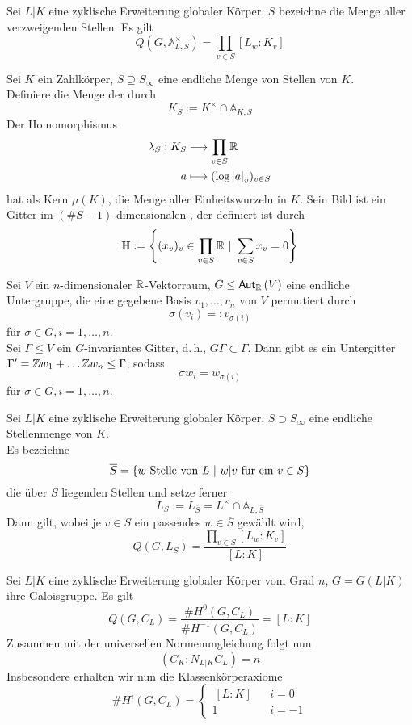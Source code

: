 \documentclass{book}
\renewcommand{\A}{\mathbb{A}}
\renewcommand{\i}{^{-1}}
\begin{document}
\Satz{}
Sei $L|K$ eine zyklische Erweiterung globaler Körper, $S$ bezeichne die Menge aller verzweigenden Stellen. Es gilt
\[ Q(G, \A_{L,S}^\times) = \prod_{v\in S} [L_w:K_v] \]

\Satz{}
Sei $K$ ein Zahlkörper, $S \supseteq S_\infty$ eine endliche Menge von Stellen von $K$.\\
Definiere die Menge der  durch
\[ K_S := K^\times \cap \A_{K,S} \]
Der Homomorphismus
\begin{align*}
\lambda_S : K_S &\overset{}{\longrightarrow} \prod_{v\in S} \mathbb{R}\\
a & \longmapsto (\log \left|a\right|_v)_{v\in S} 
\end{align*}
hat als Kern $\mu(K)$, die Menge aller Einheitswurzeln in $K$. Sein Bild ist ein Gitter im $(\#S-1)$-dimensionalen , der definiert ist durch
\[ \H:= \set{(x_v)_v \in \prod_{v\in S}\R }{\sum_{v\in S}x_v = 0} \]

\Lem{}
Sei $V$ ein $n$-dimensionaler $\mathbb{R}$-Vektorraum, $G \leq \textsf{Aut}_{\mathbb{R}}\left(V\right)$ eine endliche Untergruppe, die eine gegebene Basis $v_1,\ldots,v_n$ von $V$ permutiert durch
\[ \sigma(v_i) =: v_{\sigma(i)} \]
für $\sigma \in G, i = 1,\ldots,n$.\\
Sei $\Gamma \leq V$ ein $G$-invariantes Gitter, d.\,h., $G\Gamma \subset \Gamma$. Dann gibt es ein Untergitter $\Gamma' = \mathbb{Z} w_1 + \ldots \mathbb{Z} w_n \leq \Gamma$, sodass
\[ \sigma w_i = w_{\sigma(i)} \]
für $\sigma \in G, i = 1,\ldots,n$.

\Satz{}
Sei $L|K$ eine zyklische Erweiterung globaler Körper, $S \supset S_\infty$ eine endliche Stellenmenge von $K$.\\
Es bezeichne 
\[\overline{S} = \set{w \text{ Stelle von }L}{w|v \text{ für ein } v \in S} \]
die über $S$ liegenden Stellen und setze ferner
\[ L_S := L_{\overline{S}} = L^\times \cap \A_{L,\overline{S}} \]
Dann gilt, wobei je $v \in S$ ein passendes $w\in \overline{S}$ gewählt wird,
\[ Q(G,L_S) = \frac{\prod_{v\in S} [L_w : K_v]}{[L:K]} \]

\Satz{}
Sei $L|K$ eine zyklische Erweiterung globaler Körper vom Grad $n$, $G = G(L|K)$ ihre Galoisgruppe. Es gilt
\[ Q(G, C_L) = \frac{\# H^0(G,C_L)}{\# H\i(G,C_L)} = [L:K]  \]
Zusammen mit der universellen Normenungleichung  folgt nun
\[ (C_K : N_{L|K} C_L ) = n \]
Insbesondere erhalten wir nun die Klassenkörperaxiome
\[ \# H^i(G,C_L) = \left\lbrace
\begin{aligned}
\ [L:K] && i = 0\\
1 && i = -1
\end{aligned}
\right. \]
\end{document}

